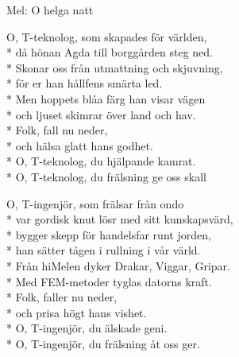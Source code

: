 \begin{SongText}[T-teknologen]
    \begin{SongInfo}
        Mel: O helga natt
    \end{SongInfo}
    \begin{SongVerse}
        O, T-teknolog, som skapades för världen,\\*%
        då hönan Agda till borggården steg ned.\\*%
        Skonar oss från utmattning och skjuvning,\\*%
        för er han hållfens smärta led.\\*%
        Men hoppets blåa färg han visar vägen\\*%
        och ljuset skimrar över land och hav.\\*%
        Folk, fall nu neder,\\*%
        och hälsa glatt hans godhet.\\*%
        O, T-teknolog, du hjälpande kamrat.\\*%
        O, T-teknolog, du frälsning ge oss skall
    \end{SongVerse}
    \begin{SongVerse}
        O, T-ingenjör, som frälsar från ondo\\*%
        var gordisk knut lösr med sitt kunskapsvärd,\\*%
        bygger skepp för handelsfar runt jorden,\\*%
        han sätter tågen i rullning i vår värld.\\*%
        Från hiMelen dyker Drakar, Viggar, Gripar.\\*%
        Med FEM-metoder tyglas datorns kraft.\\*%
        Folk, faller nu neder,\\*%
        och prisa högt hans vishet.\\*%
        O, T-ingenjör, du älskade geni.\\*%
        O, T-ingenjör, du frälsning åt oss ger.
    \end{SongVerse}
\end{SongText}
